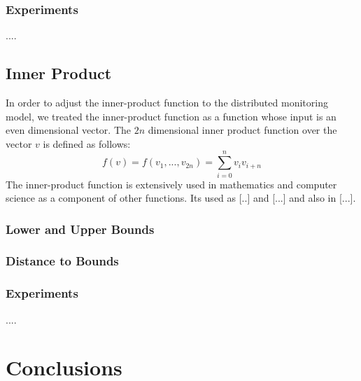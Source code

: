 \documentclass[10pt, conference]{IEEEtran}
\begin{document}
\subsubsection{Experiments}
....
\subsection{Inner Product}
In order to adjust the inner-product function to the distributed monitoring model, we treated the inner-product function as a function whose input is an even dimensional vector. The $2n$ dimensional inner product function over the vector $v$ is defined as follows:
\begin{equation}
f(v) = f(v_1,...,v_{2n}) = \sum\limits_{i=0}^{n} v_i v_{i+n}
\end{equation}
The inner-product function is extensively used in mathematics and computer science as a component of other functions. Its used as [..] and [...] and also in [...].
\subsubsection{Lower and Upper Bounds}
\subsubsection{Distance to Bounds}
\subsubsection{Experiments}
....
\section{Conclusions}




\end{document}
